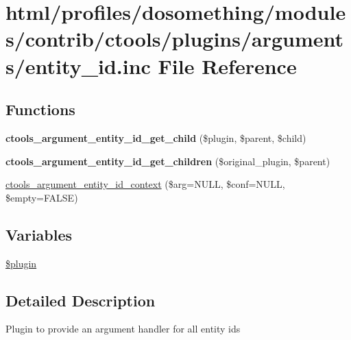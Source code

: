 \hypertarget{entity__id_8inc}{
\section{html/profiles/dosomething/modules/contrib/ctools/plugins/arguments/entity\_\-id.inc File Reference}
\label{entity__id_8inc}
}
\subsection*{Functions}
\begin{DoxyCompactItemize}
\item 
\hypertarget{entity__id_8inc_a7eaf9f6cd9edba611eca7952400d6c5f}{
{\bfseries ctools\_\-argument\_\-entity\_\-id\_\-get\_\-child} (\$plugin, \$parent, \$child)}
\label{entity__id_8inc_a7eaf9f6cd9edba611eca7952400d6c5f}

\item 
\hypertarget{entity__id_8inc_a306a48136bba62c358256030959c4276}{
{\bfseries ctools\_\-argument\_\-entity\_\-id\_\-get\_\-children} (\$original\_\-plugin, \$parent)}
\label{entity__id_8inc_a306a48136bba62c358256030959c4276}

\item 
\hyperlink{entity__id_8inc_a760a7eddc5f2841801cc8fc1662c10ff}{ctools\_\-argument\_\-entity\_\-id\_\-context} (\$arg=NULL, \$conf=NULL, \$empty=FALSE)
\end{DoxyCompactItemize}
\subsection*{Variables}
\begin{DoxyCompactItemize}
\item 
\hyperlink{entity__id_8inc_ada8a7130088351710bb02ed622d6bf65}{\$plugin}
\end{DoxyCompactItemize}


\subsection{Detailed Description}
Plugin to provide an argument handler for all entity ids 


